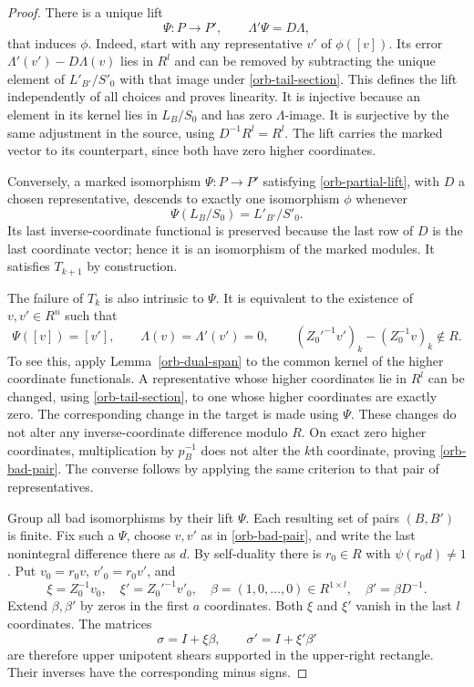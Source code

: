 \begin{proof}
There is a unique lift
\begin{equation}\label{orb-partial-lift}
 \Psi:P\longrightarrow P',\qquad
 \Lambda'\Psi=D\Lambda,
\end{equation}
that induces $\phi$.  Indeed, start with any representative
$v'$ of $\phi([v])$.  Its error
$\Lambda'(v')-D\Lambda(v)$ lies in $R^l$ and can be removed
by subtracting the unique element of $L'_{B'}/S'_0$ with
that image under \eqref{orb-tail-section}.  This defines the
lift independently of all choices and proves linearity.
It is injective because an element in its kernel lies in
$L_B/S_0$ and has zero $\Lambda$-image.  It is surjective by
the same adjustment in the source, using $D^{-1}R^l=R^l$.
The lift carries the marked vector to its counterpart, since
both have zero higher coordinates.

Conversely, a marked isomorphism $\Psi:P\to P'$ satisfying
\eqref{orb-partial-lift}, with $D$ a chosen representative,
descends to exactly one isomorphism $\phi$ whenever
\begin{equation}\label{orb-related-lattices}
 \Psi(L_B/S_0)=L'_{B'}/S'_0.
\end{equation}
Its last inverse-coordinate functional is preserved because
the last row of $D$ is the last coordinate vector; hence it
is an isomorphism of the marked modules.  It satisfies
$T_{k+1}$ by construction.

The failure of $T_k$ is also intrinsic to $\Psi$.  It is
equivalent to the existence of $v,v'\in R^n$ such that
\begin{equation}\label{orb-bad-pair}
 \Psi([v])=[v'],\qquad \Lambda(v)=\Lambda'(v')=0,
 \qquad (Z_0'^{-1}v')_k-(Z_0^{-1}v)_k\notin R.
\end{equation}
To see this, apply Lemma~\ref{orb-dual-span} to the common
kernel of the higher coordinate functionals.  A representative
whose higher coordinates lie in $R^l$ can be changed, using
\eqref{orb-tail-section}, to one whose higher coordinates
are exactly zero.  The corresponding change in the target
is made using $\Psi$.  These changes do not alter any
inverse-coordinate difference modulo $R$.  On exact zero
higher coordinates, multiplication by $p_B^{-1}$ does not
alter the $k$th coordinate, proving \eqref{orb-bad-pair}.
The converse follows by applying the same criterion to that
pair of representatives.

Group all bad isomorphisms by their lift $\Psi$.  Each resulting
set of pairs $(B,B')$ is finite.  Fix such a $\Psi$, choose
$v,v'$ as in \eqref{orb-bad-pair}, and write the last
nonintegral difference there as $d$.  By self-duality there
is $r_0\in R$ with $\psi(r_0d)\ne1$.
Put $v_0=r_0v$, $v'_0=r_0v'$, and
\[
 \xi=Z_0^{-1}v_0,\quad \xi'=Z_0'^{-1}v'_0,
 \quad\beta=(1,0,\ldots,0)\in R^{1\times l},
 \quad\beta'=\beta D^{-1}.
\]
Extend $\beta,\beta'$ by zeros in the first $a$ coordinates.
Both $\xi$ and $\xi'$ vanish in the last $l$ coordinates.
The matrices
\[
 \sigma=I+\xi\beta,\qquad
 \sigma'=I+\xi'\beta'
\]
are therefore upper unipotent shears supported in the
upper-right rectangle.  Their inverses have the corresponding
minus signs.


\end{proof}
